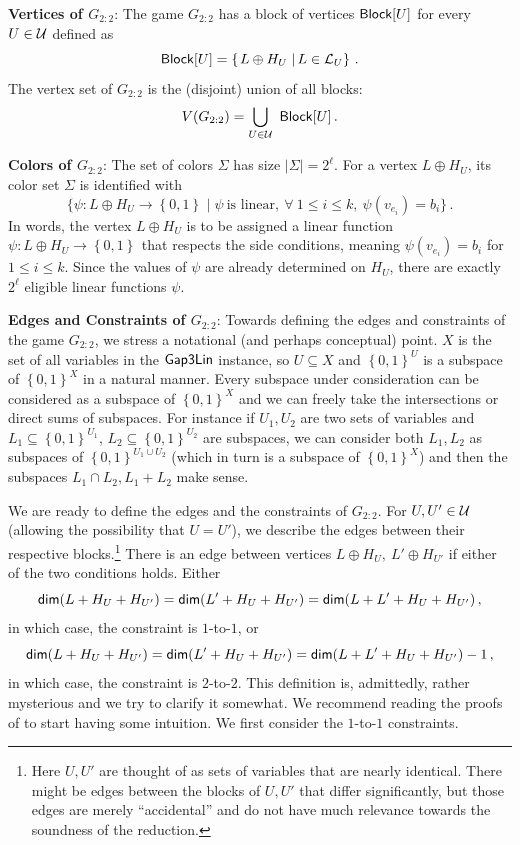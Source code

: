 \documentclass{toc}
\newcommand\sett[2]{\left\{ \left. #1 \;\right\vert #2 \right\}}
\newcommand\set[1]{{\left\{ #1 \right\}}}
\newcommand\power[1]{\set{0,1}^{#1}}
\newcommand*\xor{\mathbin{\oplus}}
\renewcommand\leq{\leqslant}
\begin{document}
\medskip
\noindent \textbf{Vertices of $G_{2:2}$}: The game $G_{2:2}$ has a block of vertices ${\sf Block}[U]$ for every $U \in {\cal U}$ defined as
  $${\sf Block}[U] = \sett{L\xor H_U}{ L\in{\cal L}_U}\,.$$%
The vertex set of $G_{2:2}$ is the (disjoint) union of all blocks:
\[
V(G_{2:2})=  \bigcup_{U \in {\cal U}}  ~{\sf Block}[U]\,.%
\]

\medskip
\noindent \textbf{Colors of  $G_{2:2}$}: The set of colors $\Sigma$ has size $|\Sigma|=2^\ell$. For a vertex $L\xor H_U$, its color
set $\Sigma$ is identified with  
 $$ \{ \psi: L \xor H_U \to \power{} \mid \psi ~\mbox{is linear}, \ \forall ~1\leq i \leq k, ~\psi(v_{e_i})=b_i  \}\,.$$%
 In words, the
 vertex $L\xor H_U$ is  to be assigned a linear function $\psi: L \xor H_U \to \power{}$
that respects the side conditions, meaning $\psi(v_{e_i}) = b_i$ for $1 \leq i \leq k$. Since the values of $\psi$ are already determined
on $H_U$, there are exactly $2^\ell$ eligible linear functions $\psi$.




\medskip
\noindent \textbf{Edges and Constraints of $G_{2:2}$}: Towards defining the edges and constraints of the game $G_{2:2}$, we stress
a notational (and perhaps conceptual) point.  $X$ is the set of all variables in the ${\sf Gap3Lin}$ instance, so $U \subseteq X$ and
 $\power{U}$ is a subspace of
$\power{X}$ in a natural manner. Every subspace under consideration can be considered as a subspace of $\power{X}$ and we can freely
take the intersections or direct sums of subspaces. For instance
 if $U_1,U_2$ are two sets of variables and $L_1\subseteq \power{U_1}$,
 $L_2\subseteq \power{U_2}$ are subspaces, we can consider both $L_1, L_2$ as subspaces of $\power{U_1 \cup U_2}$ (which in turn is
 a subspace of $\power{X}$) and then the subspaces $L_1\cap L_2, L_1+ L_2$ make sense.

\smallskip We are ready to define the edges and the constraints of $G_{2:2}$. For $U, U' \in {\cal U}$ (allowing the possibility that $U=U'$), we describe the edges
between their respective blocks.\footnote{Here $U, U'$ are thought of as sets of variables that are nearly identical. There might be
edges between the blocks of $U, U'$ that differ significantly, but those edges are merely ``accidental'' and do not have much relevance
towards the soundness of the reduction.}
There is an edge between vertices $L\xor H_U, ~L'\xor H_{U'}$ if either of the two conditions holds. Either
\begin{equation}\label{eqn:1-to-1}
{\sf dim} (L + H_U + H_{U'}) = {\sf dim} (L' + H_U + H_{U'}) = {\sf dim} (L + L' + H_U + H_{U'})\,,%
\end{equation}
in which case, the constraint is $1$-to-$1$, or
\begin{equation}
 {\sf dim} (L + H_U + H_{U'}) ={\sf dim} (L' + H_U + H_{U'}) = {\sf dim} (L + L' + H_U + H_{U'}) - 1\,,%
\end{equation}
in which case, the constraint is $2$-to-$2$. This definition is, admittedly, rather mysterious and we try to clarify it somewhat. We recommend reading the proofs of   %
to start having some intuition. We first consider the $1$-to-$1$ constraints.
\end{document}
